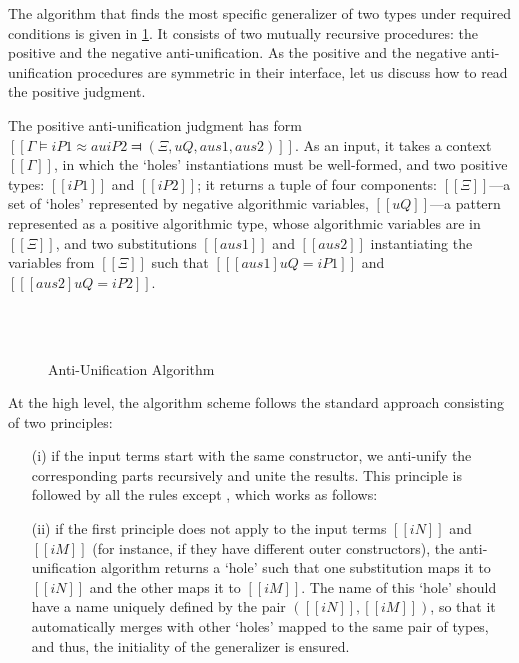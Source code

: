 The algorithm that finds the most specific generalizer of two types
under required conditions is given in \cref{fig:anti-unification}.
It consists of two mutually recursive procedures:
the positive and the negative anti-unification. 
As the positive and the negative anti-unification procedures
are symmetric in their interface, let us discuss how to read
the positive judgment. 

The positive anti-unification judgment has form
$[[Γ ⊨ iP1 ≈au iP2 ⫤ ( Ξ , uQ , aus1 , aus2 )]]$.
As an input, it takes a context $[[Γ]]$, in which the `holes'
instantiations must be well-formed, 
and two positive types: $[[iP1]]$ and $[[iP2]]$;
it returns a tuple of four components:
$[[Ξ]]$---a set of `holes' represented by negative algorithmic variables,
$[[uQ]]$---a pattern represented as a positive algorithmic type,
whose algorithmic variables are in $[[Ξ]]$,
and two substitutions $[[aus1]]$ and $[[aus2]]$
instantiating the variables from $[[Ξ]]$ such that
$[[ [aus1]uQ = iP1 ]]$ and $[[ [aus2]uQ = iP2 ]]$. 

\begin{figure}[h]
    \ottdefnAUAUPLabeled{}
    \hfill\\
    \hfill\\
    \ottdefnAUAUNLabeled{}
    \caption{Anti-Unification Algorithm}
    \label{fig:anti-unification}
\end{figure}

At the high level, the algorithm scheme follows
the standard approach \cite{todo} consisting of two principles:
\begin{enumerate}
  \item[(i)] if the input terms start with the same constructor,
    we anti-unify the corresponding parts recursively and 
    unite the results. This principle is followed by 
    all the rules except ,
    which works as follows:
  \item[(ii)] if the first principle does not apply to the input terms $[[iN]]$
    and $[[iM]]$ (for instance, if they have different outer constructors), the
    anti-unification algorithm returns a `hole' such that one substitution maps
    it to $[[iN]]$ and the other maps it to $[[iM]]$. The name of this `hole'
    should have a name uniquely defined by the pair $([[iN]], [[iM]])$, so
    that it automatically merges with other `holes' mapped to the same
    pair of types, and thus, the initiality of the generalizer is ensured. 
\end{enumerate}

